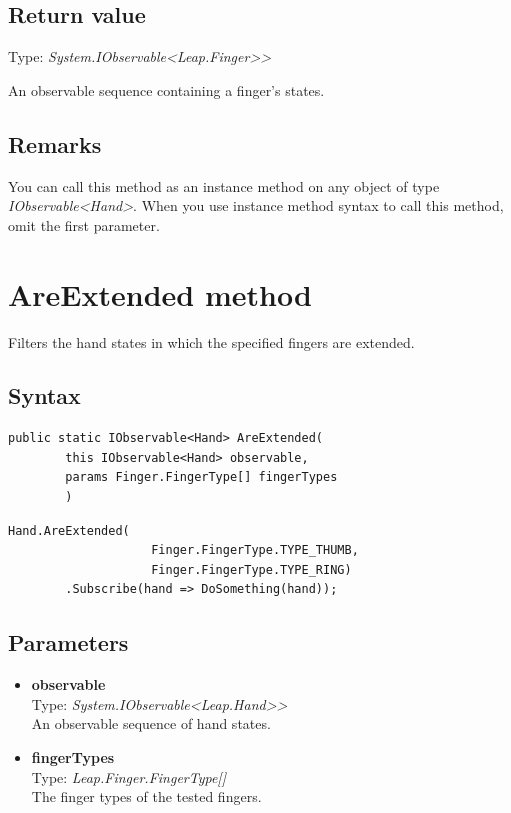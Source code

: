 \documentclass[12pt,a4paper,twoside]{report}
\begin{document}
\subsection{Return value}
Type: \textit{System.IObservable<Leap.Finger>{}>}

An observable sequence containing a finger's states.

\subsection{Remarks}
You can call this method as an instance method on any object of type \textit{IObservable<Hand>}. When you use 
instance method syntax to call this method, omit the first parameter.

\section{AreExtended method}
Filters the hand states in which the specified fingers are extended.

\subsection{Syntax}
\begin{lstlisting}[caption=Declaration]
     public static IObservable<Hand> AreExtended(
        this IObservable<Hand> observable,
        params Finger.FingerType[] fingerTypes
        )
\end{lstlisting}

\begin{lstlisting}[caption=Usage example]
    Hand.AreExtended(
                    Finger.FingerType.TYPE_THUMB,
                    Finger.FingerType.TYPE_RING)
        .Subscribe(hand => DoSomething(hand));
\end{lstlisting}

\subsection{Parameters}
\begin{itemize}
    \item \textbf{observable}\\
    Type: \textit{System.IObservable<Leap.Hand>{}>}\\
    An observable sequence of hand states.
    
    \item \textbf{fingerTypes}\\
    Type: \textit{Leap.Finger.FingerType[]}\\
    The finger types of the tested fingers.
\end{itemize}
\end{document}
